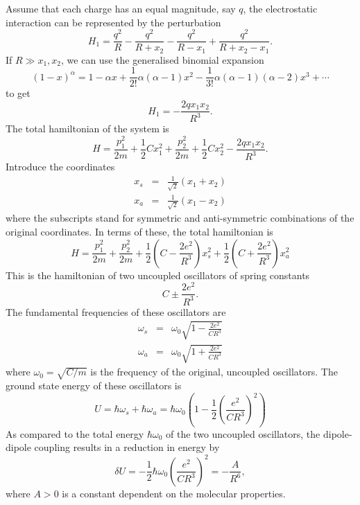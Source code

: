 \documentclass{article}
\begin{document}
Assume that each charge has an equal magnitude, say $q$, the electrostatic
interaction can be represented by the perturbation
\begin{equation}\label{e2}
H_1 = \frac{q^2}{R} - \frac{q^2}{R + x_2} - \frac{q^2}{R - x_1} + 
\frac{q^2}{R + x_2 - x_1}.
\end{equation}
If $R \gg x_1, x_2$, we can use the generalised binomial expansion
\begin{equation}\label{e3}
(1 - x)^\alpha = 1 - \alpha x + \frac{1}{2!}\alpha(\alpha - 1)x^2 - 
\frac{1}{3!}\alpha(\alpha - 1)(\alpha - 2)x^3 + \cdots
\end{equation}
to get
\begin{equation}\label{e4}
H_1 = -\frac{2qx_1x_2}{R^3}.
\end{equation}
The total hamiltonian of the system is
\begin{equation}\label{e5}
H = \frac{p_1^2}{2m}+\frac{1}{2}Cx_1^2+\frac{p_2^2}{2m}+\frac{1}{2}Cx_2^2
- \frac{2qx_1x_2}{R^3}.
\end{equation}
Introduce the coordinates
\begin{eqnarray}
x_s &=& \frac{1}{\sqrt{2}}(x_1 + x_2) \label{e6} \\
x_a &=& \frac{1}{\sqrt{2}}(x_1 - x_2) \label{e7}
\end{eqnarray}
where the subscripts stand for symmetric and anti-symmetric combinations of
the original coordinates. In terms of these, the total hamiltonian is
\begin{equation}\label{e8}
H = \frac{p_1^2}{2m} + \frac{p_2^2}{2m} + \frac{1}{2}\left(C - \frac{2e^2}{R^3}
\right)x_s^2 + \frac{1}{2}\left(C + \frac{2e^2}{R^3}\right)x_a^2
\end{equation}
This is the hamiltonian of two uncoupled oscillators of spring constants
\[
C \pm \frac{2e^2}{R^3}.
\]
The fundamental frequencies of these oscillators are
\begin{eqnarray}
\omega_s &=& \omega_0\sqrt{1 - \frac{2e^2}{CR^3}} \label{e9} \\
\omega_a &=& \omega_0\sqrt{1 + \frac{2e^2}{CR^3}} \label{e10}
\end{eqnarray}
where $\omega_0 = \sqrt{C/m}$ is the frequency of the original, uncoupled
oscillators. The ground state energy of these oscillators is
\begin{equation}\label{e11}
U = \hbar\omega_s + \hbar\omega_a = \hbar\omega_0\left(1 - \frac{1}{2}\left(
\frac{e^2}{CR^3}\right)^2\right)
\end{equation}
As compared to the total energy $\hbar\omega_0$ of the two uncoupled
oscillators, the dipole-dipole coupling results in a reduction in energy by 
\begin{equation}\label{e12}
\delta U = -\frac{1}{2}\hbar\omega_0\left(\frac{e^2}{CR^3}\right)^2
= -\frac{A}{R^6},
\end{equation}
where $A > 0$ is a constant dependent on the molecular properties.
\end{document}
